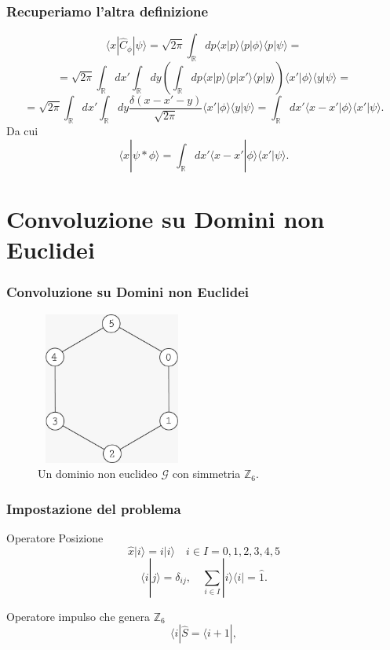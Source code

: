 \documentclass[xcolor=dvipsnames]{beamer}
\newcommand{\R}{\mathbb{R}}
\newcommand{\Z}{\mathbb{Z}}
\newcommand{\mc}[1]{\mathcal{#1}}
\begin{document}
\begin{frame}
    \frametitle{Recuperiamo l'altra definizione}
     \[ \langle x | \widehat{C}_\phi | \psi \rangle = \sqrt{2\pi} \int_\R dp \langle x | p \rangle \langle p | \phi \rangle \langle p | \psi \rangle = \] \[
      = \sqrt{2\pi} \int_\R dx' \int_\R dy \left( \int_\R dp \langle x | p \rangle \langle p | x' \rangle \langle p | y \rangle \right) \langle x' | \phi \rangle 
     \langle y | \psi \rangle = \] \[ =  \sqrt{2\pi} \int_\R dx' \int_\R dy \frac{\delta(x - x' - y)}{\sqrt{2\pi}} \langle x' | \phi \rangle \langle y | \psi \rangle = 
     \int_\R dx' \langle x - x' | \phi \rangle \langle x' | \psi \rangle . \]
     Da cui
     {\color{blue}\[ \langle x | \psi * \phi \rangle = \int_\R dx' \langle x - x' | \phi \rangle \langle x' | \psi \rangle. \] }  
\end{frame}

\section{Convoluzione su Domini \textbf{non} Euclidei}

\begin{frame}
    \frametitle{Convoluzione su Domini non Euclidei}
    \begin{figure}[H]
        \centering
        \includegraphics[width=5cm, height=5cm]{graph}
        \caption{Un dominio non euclideo $\mc{G}$ con simmetria $\Z_6$.}
    \end{figure}    
\end{frame}

\begin{frame}
    \frametitle{Impostazione del problema}
    \begin{block}{Operatore Posizione}
        \[ \widehat{x}|i\rangle = i | i \rangle \quad i \in I = {0,1,2,3,4,5} \]
        \[ \langle i | j \rangle = \delta_{ij}, \quad
    \sum_{i \in I} | i \rangle \langle i | = \widehat{1} .\]
    \end{block}
    \begin{block}{Operatore impulso che genera $\Z_6$}
    \[  \langle i | \widehat{S}  = \langle i+1 |, \]
    \end{block}
\end{frame}
\end{document}

